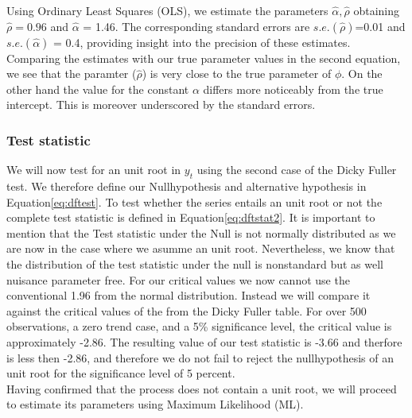 \documentclass[12pt]{article}
\begin{document}
Using Ordinary Least Squares (OLS), we estimate the parameters $\hat{\alpha}, \hat{\rho}$ obtaining $\hat{\rho} = 0.96$ and $\hat{\alpha}$ = 1.46. The corresponding standard errors are $s.e.(\hat{\rho})$=0.01 and 
$s.e.(\hat{\alpha})$ = 0.4, providing insight into the precision of these estimates.
Comparing the estimates with our true parameter values in the second equation, we see that the paramter ($\hat{\rho}$) is very close to the true parameter of $\phi$. On the other hand the value for the constant $\alpha$ differs more noticeably from the true intercept. This is moreover underscored by the standard errors.
\subsubsection{Test statistic}
We will now  test for an unit root in $y_t$ using the second case of the Dicky Fuller test. 
We therefore define our Nullhypothesis and alternative hypothesis in Equation\eqref{eq:dftest}.
To test whether the series entails an unit root or not the complete test statistic is defined in Equation\eqref{eq:dftstat2}.
It is important to mention that the Test statistic under the Null is not normally distributed as we are now in the case where we asumme an unit root. Nevertheless, we know that the distribution of the test statistic under the null is nonstandard but as well nuisance parameter free. For our critical values we now cannot use the conventional 1.96 from the normal distribution. Instead we will compare it  against the critical values of the from the Dicky Fuller table.
For over 500 observations, a zero trend case, and a 5\% significance level, the critical value is approximately -2.86.
The resulting value of our test statistic is -3.66 and therfore is less then -2.86, and therefore we do not fail to reject the nullhypothesis of an unit root for the significance level of 5 percent.\\
 Having confirmed that the process does not contain a unit root, we will proceed to estimate its parameters using Maximum Likelihood (ML). 
\end{document}
